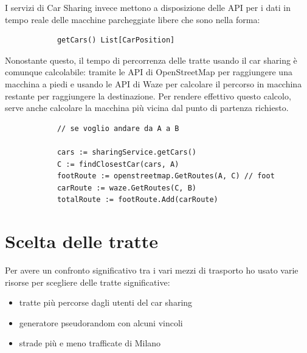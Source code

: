 \documentclass[a4paper]{report}
\begin{document}
	{\large
		I servizi di Car Sharing invece mettono a disposizione delle API per i dati in tempo reale delle macchine parcheggiate libere che sono nella forma:
		\begin{verbatim}
			getCars() List[CarPosition]
		\end{verbatim}
	}
	
	{\large
		Nonostante questo, il tempo di percorrenza delle tratte usando il car sharing è comunque calcolabile: tramite le API di OpenStreetMap per raggiungere una macchina a piedi e usando le API di Waze per calcolare il percorso in macchina restante per raggiungere la destinazione. Per rendere effettivo questo calcolo, serve anche calcolare la macchina più vicina dal punto di partenza richiesto.
		\begin{verbatim}
			// se voglio andare da A a B

			cars := sharingService.getCars()
			C := findClosestCar(cars, A)
			footRoute := openstreetmap.GetRoutes(A, C) // foot
			carRoute := waze.GetRoutes(C, B)
			totalRoute := footRoute.Add(carRoute)
		\end{verbatim}
	}

	\section{Scelta delle tratte}
	{\large
		Per avere un confronto significativo tra i vari mezzi di trasporto ho usato varie risorse per scegliere delle tratte significative:
		\begin{itemize}
			\item tratte più percorse dagli utenti del car sharing
			\item generatore pseudorandom con alcuni vincoli
			\item strade più e meno trafficate di Milano
		\end{itemize}
	}
\end{document}

